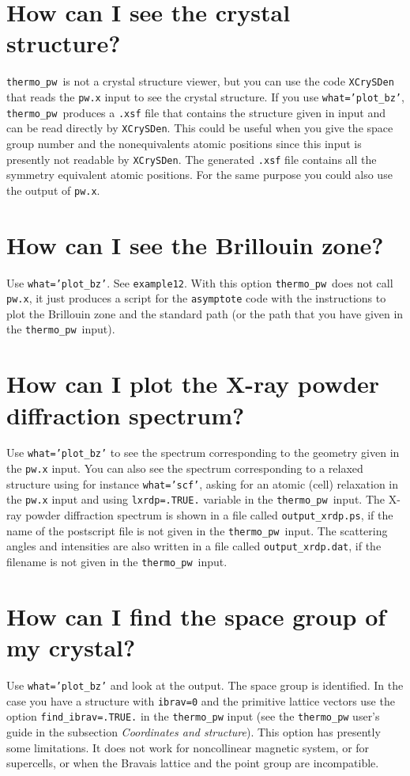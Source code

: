 \documentclass[12pt,a4paper]{article}
\def\thermo{\texttt{thermo\_pw}}
\begin{document}
\section{\color{coral}How can I see the crystal structure?}
\thermo\ is not a crystal structure viewer, but you can use the code 
\texttt{XCrySDen} that reads the \texttt{pw.x} input to
see the crystal structure. If you use \texttt{what='plot\_bz'}, 
\thermo\ produces a \texttt{.xsf} file that contains the structure given in
input and can be read directly by \texttt{XCrySDen}. This could
be useful when you give the space group number and the nonequivalents 
atomic positions since this input is presently not readable by 
\texttt{XCrySDen}.
The generated \texttt{.xsf} file contains all the symmetry equivalent 
atomic positions. For the same purpose you could also use the output
of \texttt{pw.x}.

\newpage

\section{\color{coral}How can I see the Brillouin zone?}
Use \texttt{what='plot\_bz'}. See \texttt{example12}. With this option
\thermo\ does not call \texttt{pw.x}, it just produces a script for
the \texttt{asymptote} code with the instructions to plot the Brillouin
zone and the standard path (or the path that you have given in the \thermo\ 
input).

\newpage

\section{\color{coral}How can I plot the X-ray powder diffraction spectrum?}
Use \texttt{what='plot\_bz'} to see the spectrum corresponding to
the geometry given in the \texttt{pw.x} input. You can also see the
spectrum corresponding to a relaxed structure using for instance
\texttt{what='scf'}, asking for an atomic (cell) relaxation in the \texttt{pw.x}
input and using \texttt{lxrdp=.TRUE.} variable in the \thermo\ input.
The X-ray powder diffraction spectrum is shown in a file called 
\texttt{output\_xrdp.ps}, if the name of the postscript file is not
given in the \thermo\ input. The scattering angles and intensities
are also written in a file called \texttt{output\_xrdp.dat}, if the filename
is not given in the \thermo\ input.

\newpage
\section{\color{coral}How can I find the space group of my crystal?}
Use \texttt{what='plot\_bz'} and look at the output. The space group is
identified. In the case you have a structure with \texttt{ibrav=0} and
the primitive lattice vectors use the option \texttt{find\_ibrav=.TRUE.} 
in the \texttt{thermo\_pw} input (see the \texttt{thermo\_pw} user's guide 
in the subsection
{\it Coordinates and structure}). This option has presently some limitations.
It does not work for noncollinear magnetic system, or for supercells, or
when the Bravais lattice and the point group are incompatible.
\end{document}
